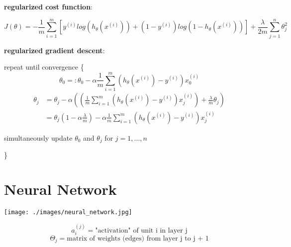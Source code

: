 \documentclass{article}
\begin{document}
\noindent \textbf{regularized cost function}:

\[J(\theta) = - \frac{1}{m} \sum_{i = 1}^{m} [y^{(i)} log(h_{\theta} (x^{(i)})) + (1 - y^{(i)}) log(1 - h_{\theta} (x^{(i)}))] + \frac{\lambda}{2m} \sum_{j = 1}^n \theta_j^2\]

\noindent \textbf{regularized gradient descent}:

\noindent repeat until convergence \{
\[\theta_0 =: \theta_0 - \alpha \frac{1}{m} \sum_{i = 1}^m (h_{\theta}(x^{(i)}) - y^{(i)}) x^{(i)}_0\]
\begin{equation*}
\begin{split}
\theta_j & = \theta_j - \alpha ((\frac{1}{m} \sum_{i = 1}^m (h_{\theta}(x^{(i)}) - y^{(i)}) x^{(i)}_j) + \frac{\lambda}{m} \theta_j) \\
 & = \theta_j (1 - \alpha \frac{\lambda}{m}) - \alpha \frac{1}{m} \sum_{i = 1}^m (h_{\theta}(x^{(i)}) - y^{(i)}) x^{(i)}_j
\end{split}
\end{equation*}

\centerline{simultaneously update \(\theta_0\) and \(\theta_j\) for \(j = 1, \dots, n\)}
\}

\section{Neural Network}

\begin{center}
\texttt{[image: ./images/neural\_network.jpg]}
\end{center}

\[a_i^{(j)} = \text{"activation" of unit i in layer j}\]
\[\Theta_j = \text{matrix of weights (edges) from layer j to j + 1}\]

\printindex
\end{document}
